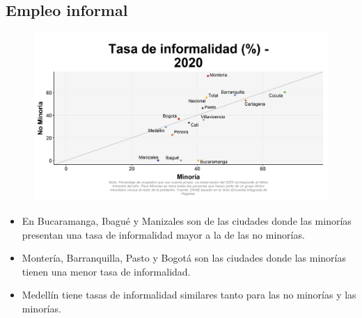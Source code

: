     \subsection{Empleo informal}

    \begin{figure}[H]
        \caption[Tasa de informalidad por ciudades por minorías y no minorías para 2020 ]{\label{informal_minoria_ciudad_scatter} }
        \begin{center}
        \includegraphics[width=\textwidth,keepaspectratio]{img/var_67_scatter.png}
        \end{center}
    \end{figure}
            \begin{itemize}
                \item En Bucaramanga, Ibagué y Manizales son de las ciudades donde las minorías presentan una tasa de informalidad mayor a la de las no minorías.
                \item Montería, Barranquilla, Pasto y Bogotá son las ciudades donde las minorías tienen una menor tasa de informalidad.
                \item Medellín tiene tasas de informalidad similares tanto para las no minorías y las minorías.
                \end{itemize}

